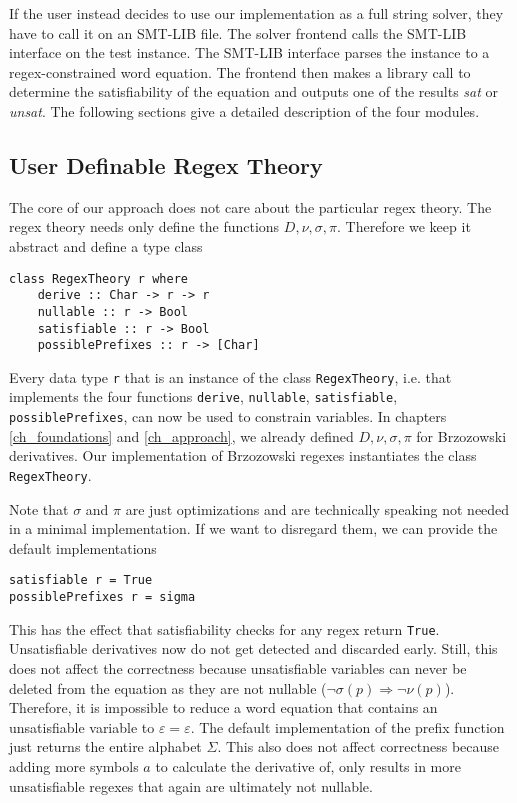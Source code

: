 If the user instead decides to use our implementation as a full string solver, they have to call it on an SMT-LIB file. The solver frontend calls the SMT-LIB interface on the test instance. The SMT-LIB interface parses the instance to a regex-constrained word equation. The frontend then makes a library call to determine the satisfiability of the equation and outputs one of the results \textit{sat} or \textit{unsat}. The following sections give a detailed description of the four modules.

\subsection{User Definable Regex Theory}
The core of our approach does not care about the particular regex theory. The regex theory needs only define the functions $D, \nu, \sigma, \pi$. Therefore we keep it abstract and define a type class

\begin{verbatim}
class RegexTheory r where
    derive :: Char -> r -> r
    nullable :: r -> Bool
    satisfiable :: r -> Bool
    possiblePrefixes :: r -> [Char]
\end{verbatim}

Every data type \texttt{r} that is an instance of the class \texttt{RegexTheory}, i.e. that implements the four functions \texttt{derive}, \texttt{nullable}, \texttt{satisfiable}, \texttt{possiblePrefixes}, can now be used to constrain variables. In chapters \ref{ch_foundations} and \ref{ch_approach}, we already defined $D, \nu, \sigma, \pi$ for Brzozowski derivatives. Our implementation of Brzozowski regexes instantiates the class \texttt{RegexTheory}.

\newpage

Note that $\sigma$ and $\pi$ are just optimizations and are technically speaking not needed in a minimal implementation. If we want to disregard them, we can provide the default implementations
\begin{verbatim}
satisfiable r = True
possiblePrefixes r = sigma
\end{verbatim}
This has the effect that satisfiability checks for any regex return \texttt{True}. Unsatisfiable derivatives now do not get detected and discarded early. Still, this does not affect the correctness because unsatisfiable variables can never be deleted from the equation as they are not nullable ($\neg\sigma(p) \Rightarrow \neg\nu(p)$). Therefore, it is impossible to reduce a word equation that contains an unsatisfiable variable to $\varepsilon = \varepsilon$. The default implementation of the prefix function just returns the entire alphabet $\Sigma$. This also does not affect correctness because adding more symbols $a$ to calculate the derivative of, only results in more unsatisfiable regexes that again are ultimately not nullable.

